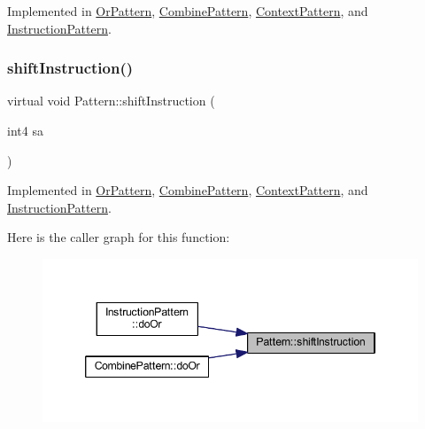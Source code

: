 Implemented in \mbox{\hyperlink{class_or_pattern_ace1bee495fdc71ae71193551ad0910eb}{Or\+Pattern}}, \mbox{\hyperlink{class_combine_pattern_a77f1097e85459ca4ee70dad774df6535}{Combine\+Pattern}}, \mbox{\hyperlink{class_context_pattern_a405d7ca6e777696895091684d1debfd8}{Context\+Pattern}}, and \mbox{\hyperlink{class_instruction_pattern_a355f6e3868e5d1e43b324bdad38e27ed}{Instruction\+Pattern}}.

\mbox{\label{class_pattern_a8a84c1487128e33cdc27c2069eb4c02a}} 
\subsubsection{\texorpdfstring{shiftInstruction()}{shiftInstruction()}}
{\footnotesize\ttfamily virtual void Pattern\+::shift\+Instruction (\begin{DoxyParamCaption}\item[{int4}]{sa }\end{DoxyParamCaption})\hspace{0.3cm}{\ttfamily [pure virtual]}}



Implemented in \mbox{\hyperlink{class_or_pattern_af13615fe47dc6f432201ee4827ff1510}{Or\+Pattern}}, \mbox{\hyperlink{class_combine_pattern_a2c69b2e5558a592ff2677c576da440bd}{Combine\+Pattern}}, \mbox{\hyperlink{class_context_pattern_acc26908cd60dbce4c4e13afed17036ba}{Context\+Pattern}}, and \mbox{\hyperlink{class_instruction_pattern_a85d29caf8da56fad4bf0805f7fdeb4a8}{Instruction\+Pattern}}.

Here is the caller graph for this function\+:
\nopagebreak
\begin{figure}[H]
\begin{center}
\leavevmode
\includegraphics[width=346pt]{class_pattern_a8a84c1487128e33cdc27c2069eb4c02a_icgraph}
\end{center}
\end{figure}
\mbox{\label{class_pattern_a9c2c1383d7f836f8af237a03e463d94d}} 
